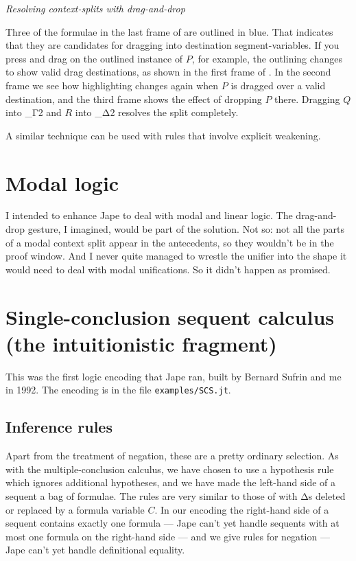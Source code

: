 \textit{Resolving context-splits with drag-and-drop}

Three of the formulae in the last frame of  are outlined in blue. That indicates that they are candidates for dragging into destination segment-variables. If you press and drag on the outlined instance of $P$, for example, the outlining changes to show valid drag destinations, as shown in the first frame of . In the second frame we see how highlighting changes again when $P$ is dragged over a valid destination, and the third frame shows the effect of dropping $P$ there. Dragging $Q$ into \_Γ2 and $R$ into \_Δ2 resolves the split completely.

A similar technique can be used with rules that involve explicit weakening.


\section{Modal logic}

I intended to enhance Jape to deal with modal and linear logic. The drag-and-drop gesture, I imagined, would be part of the solution. Not so: not all the parts of a modal context split appear in the antecedents, so they wouldn't be in the proof window. And I never quite managed to wrestle the unifier into the shape it would need to deal with modal unifications. So it didn't happen as promised.


\section{Single-conclusion sequent calculus (the intuitionistic fragment)}

This was the first logic encoding that Jape ran, built by Bernard Sufrin and me in 1992. The encoding is in the file \texttt{examples/SCS.jt}.

\subsection{Inference rules}

Apart from the treatment of negation, these are a pretty ordinary selection. As with the multiple-conclusion calculus, we have chosen to use a hypothesis rule which ignores additional hypotheses, and we have made the left-hand side of a sequent a bag of formulae. The rules are very similar to those of  with Δs deleted or replaced by a formula variable $C$. In our encoding the right-hand side of a sequent contains exactly one formula --- Jape can't yet handle sequents with at most one formula on the right-hand side --- and we give rules for negation --- Jape can't yet handle definitional equality. 

